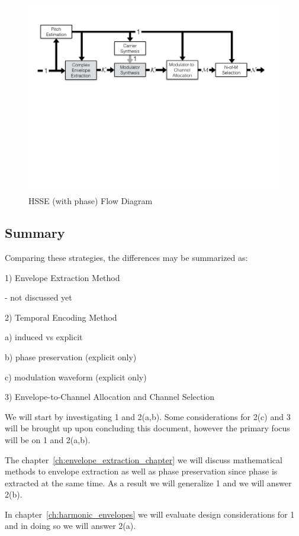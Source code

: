\documentclass [11pt, proquest] {uwthesis}[2015/03/03]
\begin{document}
\begin{figure}[!ht]
  \centering
    \includegraphics[width=1\textwidth]{HSSE_flow_diagram_Phase}   
    \caption{HSSE (with phase) Flow Diagram}
\end{figure}

\subsection{Summary}

Comparing these strategies, the differences may be summarized as:

1) Envelope Extraction Method

- not discussed yet

2) Temporal Encoding Method

a) induced vs explicit

b) phase preservation (explicit only)

c) modulation waveform (explicit only)

3) Envelope-to-Channel Allocation and Channel Selection

We will start by investigating 1 and 2(a,b).  Some considerations for 2(c) and 3 will be brought up upon concluding this document, however the primary focus will be on 1 and 2(a,b).

The chapter~\ref{ch:envelope_extraction_chapter} we will discuss mathematical methods to envelope extraction as well as phase preservation since phase is extracted at the same time.  As a result we will generalize 1 and we will answer 2(b).

In chapter~\ref{ch:harmonic_envelopes} we will evaluate design considerations for 1 and in doing so we will answer 2(a).
\end{document}
